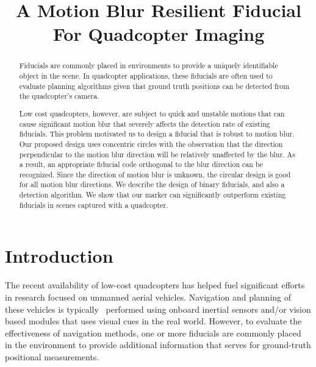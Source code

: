 \documentclass[10pt,twocolumn,letterpaper]{article}
\begin{document}
\title{A Motion Blur Resilient Fiducial For Quadcopter Imaging}
\maketitle

\begin{abstract}

Fiducials are commonly placed in environments to provide a
uniquely identifiable object in the scene.  In quadcopter
applications, these fiducials are often used to evaluate planning
algorithms given that ground truth positions can be
detected from the quadcopter's camera.

Low cost quadcopters, however, are subject to quick and unstable
motions that can cause significant motion blur that severely affects
the detection rate of existing fiducials. This problem
motivated us to design a fiducial that is robust to motion blur. Our
proposed design uses concentric circles with the observation that
the direction perpendicular to the motion blur direction will be
relatively unaffected by the blur. As a result, an appropriate
fiducial code orthogonal to the blur direction can be
recognized. Since the direction of motion blur is unknown, the
circular design is good for all motion blur directions. We describe
the design of binary fiducials, and also a detection
algorithm.  We show that our marker can significantly outperform
existing fiducials in scenes captured with a quadcopter.

\end{abstract}

\section{Introduction}

The recent availability of low-cost quadcopters has helped  fuel
significant efforts in research focused on unmanned aerial
vehicles. Navigation and planning
of these vehicles is typically~\cite{Davison:2007,Engel12,Engel13}
performed using onboard inertial sensors and/or vision based modules
that uses visual cues in the real world. However, to evaluate the
effectiveness of navigation methods, one or more fiducials are commonly
placed~\cite{Bosnak:2012,Lim09,Klopschitz:2007}
 in the environment to provide additional information that
serves for ground-truth positional measurements.
\end{document}
